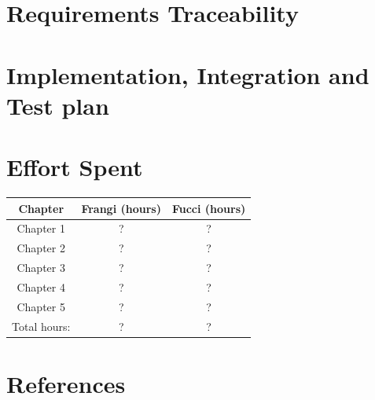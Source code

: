 \documentclass[12pt,a4paper]{report}
\begin{document}
	\chapter{Requirements Traceability}

	\chapter{Implementation, Integration and Test plan}

	\chapter{Effort Spent}
		\begin{table}[H]
		\centering
		\begin{tabular}{|c|c|c|}
			\hline
			Chapter & Frangi (hours) & Fucci (hours)\\
			\hline
			\hline
			Chapter 1 & ? & ?\\
			\hline
			Chapter 2 & ? & ?\\
			\hline
			Chapter 3 & ? & ?\\
			\hline
			Chapter 4 & ? & ?\\
			\hline
			Chapter 5 & ? & ?\\
			\hline
			Total hours: & ? & ?\\
			\hline
		\end{tabular}
		\label{tab: }
	\end{table}
	\chapter{References}
\end{document}
